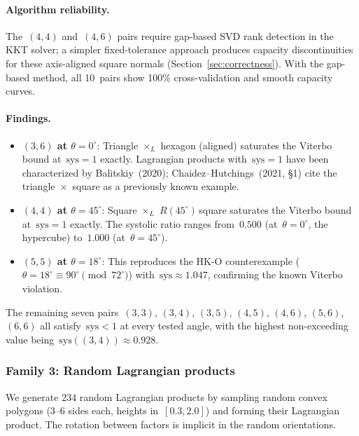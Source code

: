 \paragraph{Algorithm reliability.}
The~$(4,4)$ and~$(4,6)$ pairs require gap-based SVD rank detection in
the KKT solver; a simpler fixed-tolerance approach produces capacity
discontinuities for these axis-aligned square normals
(Section~\ref{sec:correctness}). With the gap-based method, all 10~pairs
show 100\% cross-validation and smooth capacity curves.

\paragraph{Findings.}

\begin{itemize}
\item \textbf{$(3,6)$ at $\theta = 0^\circ$}: Triangle $\times_L$ hexagon
  (aligned) saturates the Viterbo bound at~$\mathrm{sys} = 1$ exactly.
  Lagrangian products with~$\mathrm{sys} = 1$ have been characterized by
  Balitskiy~(2020); Chaidez--Hutchings~(2021, \S1) cite the
  triangle~$\times$~square as a previously known example.

\item \textbf{$(4,4)$ at $\theta = 45^\circ$}: Square $\times_L$
  $R(45^\circ)$\,square saturates the Viterbo bound
  at~$\mathrm{sys} = 1$ exactly. The systolic ratio ranges from~$0.500$
  (at~$\theta = 0^\circ$, the hypercube) to~$1.000$ (at~$\theta = 45^\circ$).

\item \textbf{$(5,5)$ at $\theta = 18^\circ$}: This reproduces the HK-O
  counterexample ($\theta = 18^\circ \equiv 90^\circ \pmod{72^\circ}$)
  with~$\mathrm{sys} \approx 1.047$, confirming the known Viterbo violation.
\end{itemize}

The remaining seven pairs~$(3,3)$, $(3,4)$, $(3,5)$, $(4,5)$, $(4,6)$,
$(5,6)$, $(6,6)$ all satisfy~$\mathrm{sys} < 1$ at every tested angle,
with the highest non-exceeding value being~$\mathrm{sys}((3,4)) \approx 0.928$.

\subsubsection*{Family 3: Random Lagrangian products}

We generate 234 random Lagrangian products by sampling random convex
polygons (3--6 sides each, heights in~$[0.3, 2.0]$) and forming their
Lagrangian product. The rotation between factors is implicit in the random
orientations.

